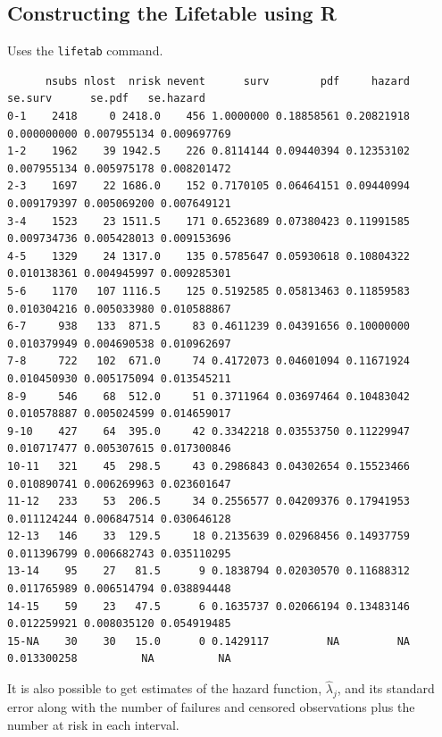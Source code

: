 \documentclass[11pt,slidesonly,semrot,portrait,palatino]{book}
\begin{document}

\subsection{Constructing the Lifetable using R}
Uses the {\tt lifetab} command.
\\
\scriptsize
\begin{verbatim}
      nsubs nlost  nrisk nevent      surv        pdf     hazard     se.surv      se.pdf   se.hazard
0-1    2418     0 2418.0    456 1.0000000 0.18858561 0.20821918 0.000000000 0.007955134 0.009697769
1-2    1962    39 1942.5    226 0.8114144 0.09440394 0.12353102 0.007955134 0.005975178 0.008201472
2-3    1697    22 1686.0    152 0.7170105 0.06464151 0.09440994 0.009179397 0.005069200 0.007649121
3-4    1523    23 1511.5    171 0.6523689 0.07380423 0.11991585 0.009734736 0.005428013 0.009153696
4-5    1329    24 1317.0    135 0.5785647 0.05930618 0.10804322 0.010138361 0.004945997 0.009285301
5-6    1170   107 1116.5    125 0.5192585 0.05813463 0.11859583 0.010304216 0.005033980 0.010588867
6-7     938   133  871.5     83 0.4611239 0.04391656 0.10000000 0.010379949 0.004690538 0.010962697
7-8     722   102  671.0     74 0.4172073 0.04601094 0.11671924 0.010450930 0.005175094 0.013545211
8-9     546    68  512.0     51 0.3711964 0.03697464 0.10483042 0.010578887 0.005024599 0.014659017
9-10    427    64  395.0     42 0.3342218 0.03553750 0.11229947 0.010717477 0.005307615 0.017300846
10-11   321    45  298.5     43 0.2986843 0.04302654 0.15523466 0.010890741 0.006269963 0.023601647
11-12   233    53  206.5     34 0.2556577 0.04209376 0.17941953 0.011124244 0.006847514 0.030646128
12-13   146    33  129.5     18 0.2135639 0.02968456 0.14937759 0.011396799 0.006682743 0.035110295
13-14    95    27   81.5      9 0.1838794 0.02030570 0.11688312 0.011765989 0.006514794 0.038894448
14-15    59    23   47.5      6 0.1635737 0.02066194 0.13483146 0.012259921 0.008035120 0.054919485
15-NA    30    30   15.0      0 0.1429117         NA         NA 0.013300258          NA          NA
\end{verbatim}
\normalsize It is also possible to get estimates of the hazard function, $\hat\lambda_j$, and its standard error along with the number of
failures and censored observations plus the number at risk in each interval.
\end{document}
